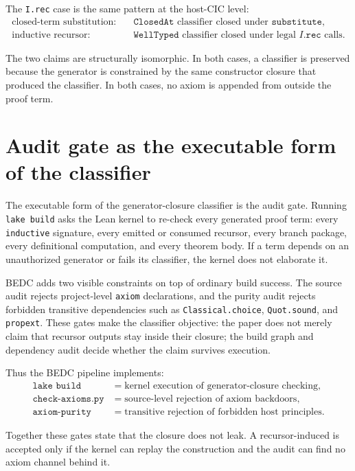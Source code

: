 The \texttt{I.rec} case is the same pattern at the host-CIC level:
$$
\begin{aligned}
\text{closed-term substitution:}\quad
&\texttt{ClosedAt} \text{ classifier closed under } \texttt{substitute},\\
\text{inductive recursor:}\quad
&\texttt{WellTyped} \text{ classifier closed under legal } I.\texttt{rec} \text{ calls}.
\end{aligned}
$$

The two claims are structurally isomorphic. In both cases, a classifier is preserved because the generator is constrained by the same constructor closure that produced the classifier. In both cases, no axiom is appended from outside the proof term.

\section{Audit gate as the executable form of the classifier}
\label{sec:recursor-audit-gate}

The executable form of the generator-closure classifier is the audit gate. Running \texttt{lake build} asks the Lean kernel to re-check every generated proof term: every \texttt{inductive} signature, every emitted or consumed recursor, every branch package, every definitional computation, and every theorem body. If a term depends on an unauthorized generator or fails its classifier, the kernel does not elaborate it.

BEDC adds two visible constraints on top of ordinary build success. The source audit rejects project-level \texttt{axiom} declarations, and the purity audit rejects forbidden transitive dependencies such as \texttt{Classical.choice}, \texttt{Quot.sound}, and \texttt{propext}. These gates make the classifier objective: the paper does not merely claim that recursor outputs stay inside their closure; the build graph and dependency audit decide whether the claim survives execution.

Thus the BEDC pipeline implements:
$$
\begin{aligned}
\texttt{lake build}
&= \text{kernel execution of generator-closure checking},\\
\texttt{check-axioms.py}
&= \text{source-level rejection of axiom backdoors},\\
\texttt{axiom-purity}
&= \text{transitive rejection of forbidden host principles}.
\end{aligned}
$$

Together these gates state that the closure does not leak. A recursor-induced \NameCert{} is accepted only if the kernel can replay the construction and the audit can find no axiom channel behind it.

